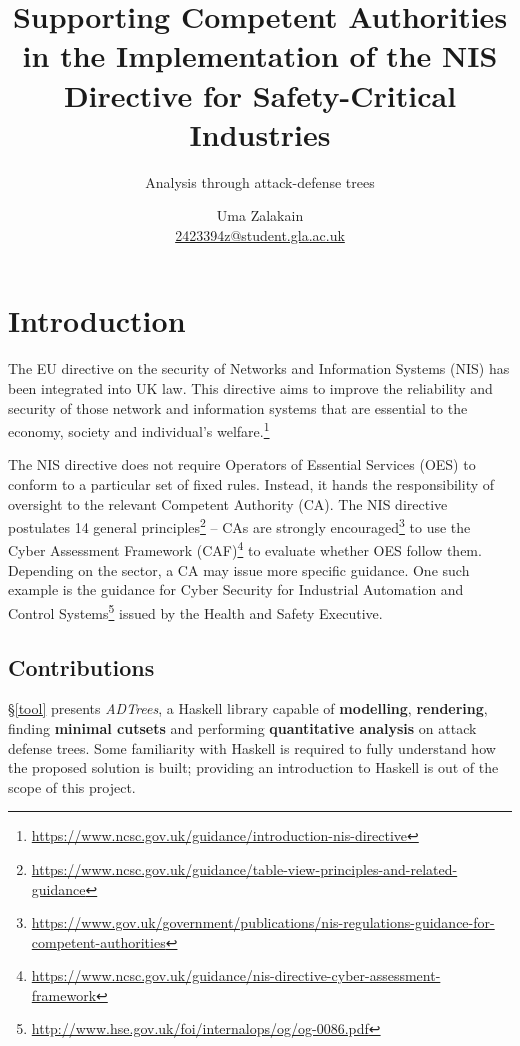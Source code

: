 \documentclass{scrreprt}
\begin{document}
\title{Supporting Competent Authorities in the Implementation of the NIS
Directive for Safety-Critical Industries}
\subtitle{Analysis through attack-defense trees}
\author{Uma Zalakain \\ \href{mailto:2423394z@student.gla.ac.uk}{2423394z@student.gla.ac.uk}}

{\let\newpage\relax\maketitle}
\doclicenseThis
\newpage

\setcounter{tocdepth}{2}
\tableofcontents
\newpage
{}

\chapter{Introduction}

The EU directive on the security of Networks and Information Systems (NIS) has
been integrated into UK law. This directive aims to improve the reliability and
security of those network and information systems that are essential to the
economy, society and individual's
welfare.\footnote{\url{https://www.ncsc.gov.uk/guidance/introduction-nis-directive}}

The NIS directive does not require Operators of Essential Services (OES) to
conform to a particular set of fixed rules. Instead, it hands the responsibility
of oversight to the relevant Competent Authority (CA). The NIS directive
postulates 14 general
principles\footnote{\url{https://www.ncsc.gov.uk/guidance/table-view-principles-and-related-guidance}}
-- CAs are strongly
encouraged\footnote{\url{https://www.gov.uk/government/publications/nis-regulations-guidance-for-competent-authorities}}
to use the Cyber Assessment Framework
(CAF)\footnote{\url{https://www.ncsc.gov.uk/guidance/nis-directive-cyber-assessment-framework}}
to evaluate whether OES follow them. Depending on the sector, a CA may issue
more specific guidance. One such example is the guidance for Cyber Security for
Industrial Automation and Control
Systems\footnote{\url{http://www.hse.gov.uk/foi/internalops/og/og-0086.pdf}}
issued by the Health and Safety Executive.

\section{Contributions}

\S\ref{tool} presents \textit{ADTrees}, a Haskell library capable of
\textbf{modelling}, \textbf{rendering}, finding \textbf{minimal cutsets} and
performing \textbf{quantitative analysis} on attack defense trees. Some
familiarity with Haskell is required to fully understand how the proposed
solution is built; providing an introduction to Haskell is out of the scope of
this project.
\end{document}
